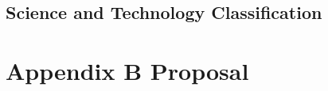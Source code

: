 \documentclass[
  12pt,
  oneside]{book}
\begin{document}

\hypertarget{science-and-technology-classification}{%
\section*{Science and Technology Classification}\label{science-and-technology-classification}}

\hypertarget{appendix-b-proposal}{%
\chapter*{Appendix B Proposal}\label{appendix-b-proposal}}

\enddocument

\printbibliography
\end{document}
